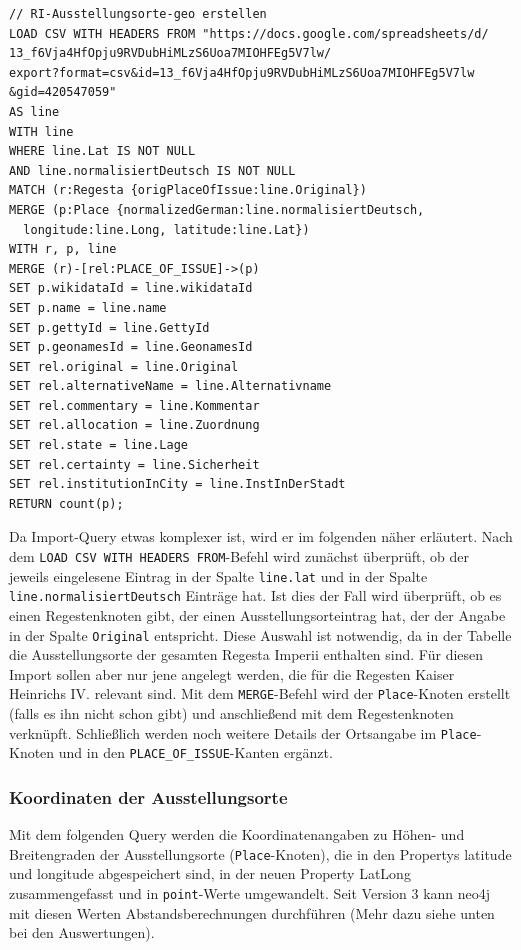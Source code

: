 \documentclass[12pt,ngerman,]{article}
\begin{document}
\begin{verbatim}
// RI-Ausstellungsorte-geo erstellen
LOAD CSV WITH HEADERS FROM "https://docs.google.com/spreadsheets/d/
13_f6Vja4HfOpju9RVDubHiMLzS6Uoa7MIOHFEg5V7lw/
export?format=csv&id=13_f6Vja4HfOpju9RVDubHiMLzS6Uoa7MIOHFEg5V7lw
&gid=420547059"
AS line
WITH line
WHERE line.Lat IS NOT NULL
AND line.normalisiertDeutsch IS NOT NULL
MATCH (r:Regesta {origPlaceOfIssue:line.Original})
MERGE (p:Place {normalizedGerman:line.normalisiertDeutsch,
  longitude:line.Long, latitude:line.Lat})
WITH r, p, line
MERGE (r)-[rel:PLACE_OF_ISSUE]->(p)
SET p.wikidataId = line.wikidataId
SET p.name = line.name
SET p.gettyId = line.GettyId
SET p.geonamesId = line.GeonamesId
SET rel.original = line.Original
SET rel.alternativeName = line.Alternativname
SET rel.commentary = line.Kommentar
SET rel.allocation = line.Zuordnung
SET rel.state = line.Lage
SET rel.certainty = line.Sicherheit
SET rel.institutionInCity = line.InstInDerStadt
RETURN count(p);
\end{verbatim}

Da Import-Query etwas komplexer ist, wird er im folgenden näher
erläutert. Nach dem \texttt{LOAD\ CSV\ WITH\ HEADERS\ FROM}-Befehl wird
zunächst überprüft, ob der jeweils eingelesene Eintrag in der Spalte
\texttt{line.lat} und in der Spalte \texttt{line.normalisiertDeutsch}
Einträge hat. Ist dies der Fall wird überprüft, ob es einen
Regestenknoten gibt, der einen Ausstellungsorteintrag hat, der der
Angabe in der Spalte \texttt{Original} entspricht. Diese Auswahl ist
notwendig, da in der Tabelle die Ausstellungsorte der gesamten Regesta
Imperii enthalten sind. Für diesen Import sollen aber nur jene angelegt
werden, die für die Regesten Kaiser Heinrichs IV. relevant sind. Mit dem
\texttt{MERGE}-Befehl wird der \texttt{Place}-Knoten erstellt (falls es
ihn nicht schon gibt) und anschließend mit dem Regestenknoten verknüpft.
Schließlich werden noch weitere Details der Ortsangabe im
\texttt{Place}-Knoten und in den \texttt{PLACE\_OF\_ISSUE}-Kanten
ergänzt.

\subsubsection{Koordinaten der
Ausstellungsorte}\label{koordinaten-der-ausstellungsorte}

Mit dem folgenden Query werden die Koordinatenangaben zu Höhen- und
Breitengraden der Ausstellungsorte (\texttt{Place}-Knoten), die in den
Propertys latitude und longitude abgespeichert sind, in der neuen
Property LatLong zusammengefasst und in \texttt{point}-Werte
umgewandelt. Seit Version 3 kann neo4j mit diesen Werten
Abstandsberechnungen durchführen (Mehr dazu siehe unten bei den
Auswertungen).
\end{document}
